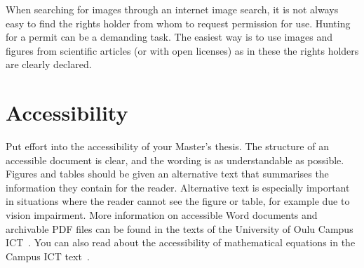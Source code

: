 When searching for images through an internet image search, it is not
always easy to find the rights holder from whom to request permission
for use. Hunting for a permit can be a demanding task. The easiest way
is to use images and figures from scientific articles (or with open
licenses) as in these the rights holders are clearly declared.

\section{Accessibility}
\label{accessibility}
Put effort into the accessibility of your Master’s thesis. The
structure of an accessible document is clear, and the wording is as
understandable as possible. Figures and tables should be given an
alternative text that summarises the information they contain for the
reader. Alternative text is especially important in situations where
the reader cannot see the figure or table, for example due to vision
impairment.  More information on accessible Word documents and
archivable PDF files can be found in the texts of the University of
Oulu Campus ICT~\cite{ictaccessibleword,ictwordpdfa}. You can also
read about the accessibility of mathematical equations in the Campus
ICT text~\cite{ictaccessiblemath}.

